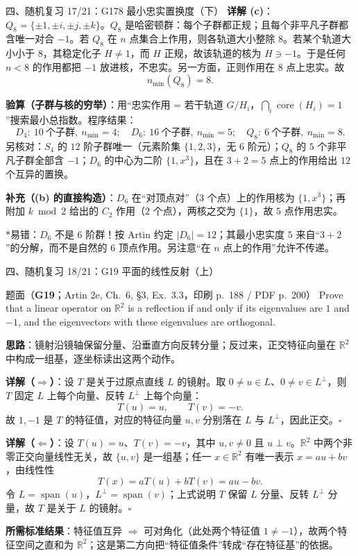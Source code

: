 \documentclass[aspectratio=169,10pt,fontset=none]{ctexbeamer}
\newcommand{\ex}[1]{\textcolor{accent}{\footnotesize\bfseries #1}}
\newcommand{\key}[1]{\textcolor{ink}{\bfseries #1}}
\newcommand{\starpt}{\textcolor{accent}{\bfseries$\ast$}}
\begin{document}
\begin{frame}[t]{四、随机复习 17/21：G178 最小忠实置换度（下）}
\scriptsize
\key{详解 (c)}：$Q_8=\{\pm1,\pm i,\pm j,\pm k\}$。$Q_8$ 是哈密顿群：每个子群都正规；且每个非平凡子群都含唯一对合 $-1$。若 $Q_8$ 在 $n$ 点集合上作用，则各轨道大小整除 $8$。若某个轨道大小小于 $8$，其稳定化子 $H\ne1$，而 $H$ 正规，故该轨道的核为 $H\ni-1$。于是任何 $n<8$ 的作用都把 $-1$ 放进核，不忠实。另一方面，正则作用在 $8$ 点上忠实。故
\[ n_{\min}(Q_8)=8. \]

\key{验算（子群与核的穷举）}：用“忠实作用 = 若干轨道 $G/H_i$，$\bigcap_i \operatorname{core}(H_i)=1$”搜索最小总指数。程序结果：
\[ D_4:\ 10\ \text{个子群},\ n_{\min}=4;\quad D_6:\ 16\ \text{个子群},\ n_{\min}=5;\quad Q_8:\ 6\ \text{个子群},\ n_{\min}=8. \]
另核对：$S_4$ 的 $12$ 阶子群唯一（元素阶集 $\{1,2,3\}$，无 $6$ 阶元）；$Q_8$ 的 $5$ 个非平凡子群全部含 $-1$；$D_6$ 的中心为二阶 $\{1,x^3\}$，且在 $3+2=5$ 点上的作用给出 $12$ 个互异的置换。

\key{补充（(b) 的直接构造）}：$D_6$ 在“对顶点对”（$3$ 个点）上的作用核为 $\{1,x^3\}$；再附加 $k\bmod2$ 给出的 $C_2$ 作用（$2$ 个点），两核之交为 $\{1\}$，故 $5$ 点作用忠实。

\starpt 易错：$D_6$ 不是 $6$ 阶群！按 Artin 约定 $|D_6|=12$；其最小忠实度 $5$ 来自“$3+2$”的分解，而不是自然的 $6$ 顶点作用。另注意“在 $n$ 点上的作用”允许不传递。
\end{frame}

\begin{frame}[t]{四、随机复习 18/21：G19 平面的线性反射（上）}
\label{ex:G19}
\scriptsize
\begin{block}{\footnotesize 题面（\ex{G19}；Artin 2e, Ch.~6, §3, Ex.~3.3，印刷 p.~188 / PDF p.~200）}
Prove that a linear operator on $\mathbb R^2$ is a reflection if and only if its eigenvalues are $1$ and $-1$, and the eigenvectors with these eigenvalues are orthogonal.
\end{block}
\key{思路}：镜射沿镜轴保留分量、沿垂直方向反转分量；反过来，正交特征向量在 $\mathbb R^2$ 中构成一组基，逐坐标读出这两个动作。

\key{详解（$\Rightarrow$）}：设 $T$ 是关于过原点直线 $L$ 的镜射。取 $0\ne u\in L$、$0\ne v\in L^\perp$，则 $T$ 固定 $L$ 上每个向量、反转 $L^\perp$ 上每个向量：
\[ T(u)=u,\qquad T(v)=-v. \]
故 $1,-1$ 是 $T$ 的特征值，对应的特征向量 $u,v$ 分别落在 $L$ 与 $L^\perp$，因此正交。$\square$

\key{详解（$\Leftarrow$）}：设 $T(u)=u$、$T(v)=-v$，其中 $u,v\ne0$ 且 $u\perp v$。$\mathbb R^2$ 中两个非零正交向量线性无关，故 $\{u,v\}$ 是一组基；任一 $x\in\mathbb R^2$ 有唯一表示 $x=au+bv$，由线性性
\[ T(x)=aT(u)+bT(v)=au-bv. \]
令 $L=\operatorname{span}(u)$，$L^\perp=\operatorname{span}(v)$；上式说明 $T$ 保留 $L$ 分量、反转 $L^\perp$ 分量，故 $T$ 是关于 $L$ 的镜射。$\square$

\key{所需标准结果}：特征值互异 $\Rightarrow$ 可对角化（此处两个特征值 $1\ne-1$），故两个特征空间之直和为 $\mathbb R^2$；这是第二方向把“特征值条件”转成“存在特征基”的依据。
\end{frame}
\end{document}
